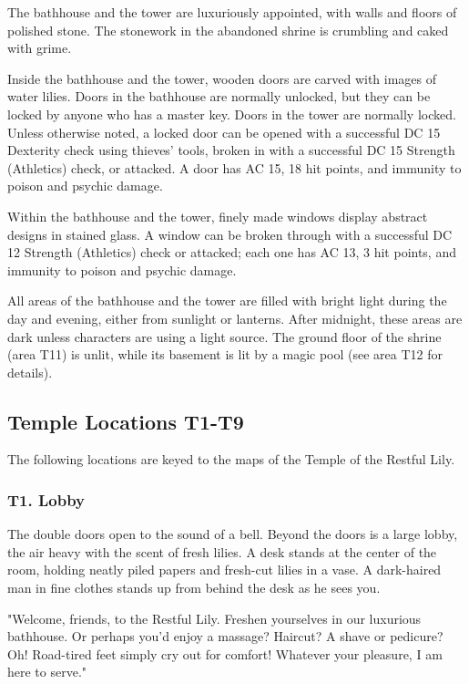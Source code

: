 \documentclass[10pt,a4paper,twoside,bg=print,twocolumn,openany,nodeprecatedcode]{dndbook}
\begin{document}
\begin{description}[nolistsep]
\item[Walls and Floors]
The bathhouse and the tower are luxuriously appointed, with walls and floors of polished stone. The stonework in the abandoned shrine is crumbling and caked with grime.
\item[Doors]
Inside the bathhouse and the tower, wooden doors are carved with images of water lilies. Doors in the bathhouse are normally unlocked, but they can be locked by anyone who has a master key. Doors in the tower are normally locked. Unless otherwise noted, a locked door can be opened with a successful DC 15 Dexterity check using thieves' tools, broken in with a successful DC 15 Strength (Athletics) check, or attacked. A door has AC 15, 18 hit points, and immunity to poison and psychic damage.
\item[Windows]
Within the bathhouse and the tower, finely made windows display abstract designs in stained glass. A window can be broken through with a successful DC 12 Strength (Athletics) check or attacked; each one has AC 13, 3 hit points, and immunity to poison and psychic damage.
\item[Light]
All areas of the bathhouse and the tower are filled with bright light during the day and evening, either from sunlight or lanterns. After midnight, these areas are dark unless characters are using a light source. The ground floor of the shrine (area T11) is unlit, while its basement is lit by a magic pool (see area T12 for details).
\end{description}

\subsection{Temple Locations T1-T9}
The following locations are keyed to the maps of the Temple of the Restful Lily.

\subsubsection{T1. Lobby}
\begin{DndReadAloud}{}
The double doors open to the sound of a bell. Beyond the doors is a large lobby, the air heavy with the scent of fresh lilies. A desk stands at the center of the room, holding neatly piled papers and fresh-cut lilies in a vase. A dark-haired man in fine clothes stands up from behind the desk as he sees you.

"Welcome, friends, to the Restful Lily. Freshen yourselves in our luxurious bathhouse. Or perhaps you'd enjoy a massage? Haircut? A shave or pedicure? Oh! Road-tired feet simply cry out for comfort! Whatever your pleasure, I am here to serve."

\end{DndReadAloud}
\end{document}
